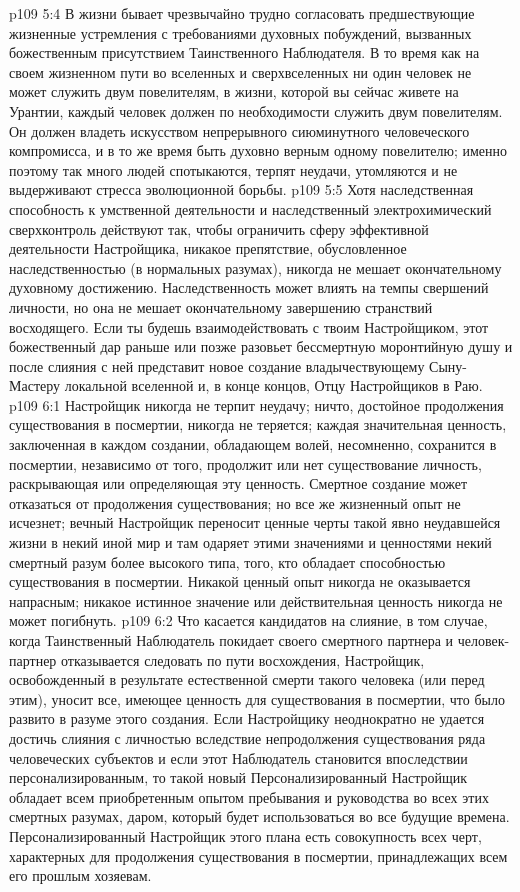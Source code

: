 \vs p109 5:4 \pc В жизни бывает чрезвычайно трудно согласовать предшествующие жизненные устремления с требованиями духовных побуждений, вызванных божественным присутствием Таинственного Наблюдателя. В то время как на своем жизненном пути во вселенных и сверхвселенных ни один человек не может служить двум повелителям, в жизни, которой вы сейчас живете на Урантии, каждый человек должен по необходимости служить двум повелителям. Он должен владеть искусством непрерывного сиюминутного человеческого компромисса, и в то же время быть духовно верным одному повелителю; именно поэтому так много людей спотыкаются, терпят неудачи, утомляются и не выдерживают стресса эволюционной борьбы.
\vs p109 5:5 Хотя наследственная способность к умственной деятельности и наследственный электрохимический сверхконтроль действуют так, чтобы ограничить сферу эффективной деятельности Настройщика, никакое препятствие, обусловленное наследственностью (в нормальных разумах), никогда не мешает окончательному духовному достижению. Наследственность может влиять на темпы свершений личности, но она не мешает окончательному завершению странствий восходящего. Если ты будешь взаимодействовать с твоим Настройщиком, этот божественный дар раньше или позже разовьет бессмертную моронтийную душу и после слияния с ней представит новое создание владычествующему Сыну\hyp{}Мастеру локальной вселенной и, в конце концов, Отцу Настройщиков в Раю.
\vs p109 6:1 Настройщик никогда не терпит неудачу; ничто, достойное продолжения существования в посмертии, никогда не теряется; каждая значительная ценность, заключенная в каждом создании, обладающем волей, несомненно, сохранится в посмертии, независимо от того, продолжит или нет существование личность, раскрывающая или определяющая эту ценность. Смертное создание может отказаться от продолжения существования; но все же жизненный опыт не исчезнет; вечный Настройщик переносит ценные черты такой явно неудавшейся жизни в некий иной мир и там одаряет этими значениями и ценностями некий смертный разум более высокого типа, того, кто обладает способностью существования в посмертии. Никакой ценный опыт никогда не оказывается напрасным; никакое истинное значение или действительная ценность никогда не может погибнуть.
\vs p109 6:2 Что касается кандидатов на слияние, в том случае, когда Таинственный Наблюдатель покидает своего смертного партнера и человек\hyp{}партнер отказывается следовать по пути восхождения, Настройщик, освобожденный в результате естественной смерти такого человека (или перед этим), уносит все, имеющее ценность для существования в посмертии, что было развито в разуме этого создания. Если Настройщику неоднократно не удается достичь слияния с личностью вследствие непродолжения существования ряда человеческих субъектов и если этот Наблюдатель становится впоследствии персонализированным, то такой новый Персонализированный Настройщик обладает всем приобретенным опытом пребывания и руководства во всех этих смертных разумах, даром, который будет использоваться во все будущие времена. Персонализированный Настройщик этого плана есть совокупность всех черт, характерных для продолжения существования в посмертии, принадлежащих всем его прошлым хозяевам.
